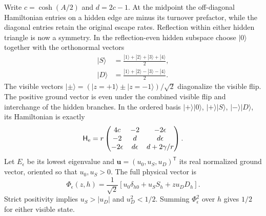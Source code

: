\documentclass[aps,pre,reprint,amsmath,amssymb,longbibliography,floatfix]{revtex4-2}
\begin{document}
Write $c=\cosh(A/2)$ and $d=2c-1$. At the midpoint the off-diagonal
Hamiltonian entries on a hidden edge are minus its turnover
prefactor, while the diagonal entries retain the original escape
rates. Reflection within either hidden triangle is now a symmetry.
In the reflection-even hidden subspace choose $|0\rangle$ together with
the orthonormal vectors
\begin{equation}
 \begin{aligned}
 |S\rangle&=\frac{|1\rangle+|2\rangle+|3\rangle+|4\rangle}{2},\\
 |D\rangle&=\frac{|1\rangle+|2\rangle-|3\rangle-|4\rangle}{2}.
 \end{aligned}
 \label{eq:memory-hidden-basis}
\end{equation}
The visible vectors $|\pm\rangle=(|z=+1\rangle\pm|z=-1\rangle)/\sqrt2$
diagonalize the visible flip. The positive ground vector is even under
the combined visible flip and interchange of the hidden branches.
In the ordered basis $|+\rangle|0\rangle$, $|+\rangle|S\rangle$,
$|-\rangle|D\rangle$, its Hamiltonian is exactly
\begin{equation}
 \mathsf H_{\rm e}
 =r\begin{pmatrix}
 4c&-2&-2\epsilon\\
 -2&d&d\epsilon\\
 -2\epsilon&d\epsilon&d+2\gamma/r
 \end{pmatrix}.
 \label{eq:memory-even-block}
\end{equation}
Let $E_\epsilon$ be its lowest eigenvalue and
$\boldsymbol u=(u_0,u_S,u_D)^{\mathsf T}$ its real normalized ground
vector, oriented so that $u_0,u_S>0$.
The full physical vector is
\begin{equation}
 \Phi_\epsilon(z,h)=\frac1{\sqrt2}
 \left[u_0\delta_{h0}+u_S S_h+z u_D D_h\right].
 \label{eq:memory-positive-vector}
\end{equation}
Strict positivity implies $u_S>|u_D|$ and $u_D^2<1/2$.
Summing $\Phi_\epsilon^2$ over $h$ gives $1/2$ for either visible state.
\end{document}

